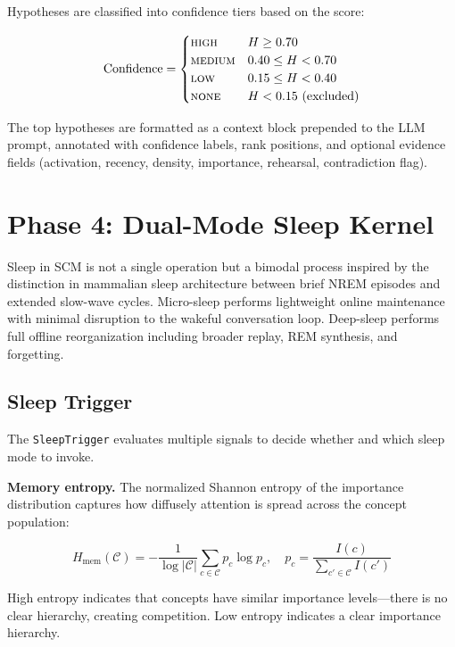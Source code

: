 \documentclass[11pt,twocolumn]{article}
\begin{document}
Hypotheses are classified into confidence tiers based on the score:

\begin{equation}
\text{Confidence} = \begin{cases}
\text{\scshape high}   & H \geq 0.70 \\
\text{\scshape medium} & 0.40 \leq H < 0.70 \\
\text{\scshape low}    & 0.15 \leq H < 0.40 \\
\text{\scshape none}   & H < 0.15 \ (\text{excluded})
\end{cases}
\label{eq:confidence}
\end{equation}

The top hypotheses are formatted as a context block prepended to the LLM prompt, annotated with confidence labels, rank positions, and optional evidence fields (activation, recency, density, importance, rehearsal, contradiction flag).

\section{Phase 4: Dual-Mode Sleep Kernel}

Sleep in SCM is not a single operation but a bimodal process inspired by the distinction in mammalian sleep architecture between brief NREM episodes and extended slow-wave cycles. Micro-sleep performs lightweight online maintenance with minimal disruption to the wakeful conversation loop. Deep-sleep performs full offline reorganization including broader replay, REM synthesis, and forgetting.

\subsection{Sleep Trigger}

The \texttt{SleepTrigger} evaluates multiple signals to decide whether and which sleep mode to invoke.

\textbf{Memory entropy.} The normalized Shannon entropy of the importance distribution captures how diffusely attention is spread across the concept population:

\begin{equation}
H_{\text{mem}}(\mathcal{C}) = -\frac{1}{\log |\mathcal{C}|} \sum_{c \in \mathcal{C}} p_c \log p_c, \quad p_c = \frac{I(c)}{\sum_{c' \in \mathcal{C}} I(c')}
\label{eq:entropy}
\end{equation}

High entropy indicates that concepts have similar importance levels---there is no clear hierarchy, creating competition. Low entropy indicates a clear importance hierarchy.
\end{document}
